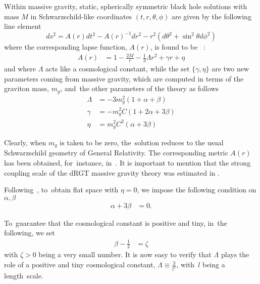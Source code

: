 \documentclass[aps,amsmath,amssymb,twocolumn]{revtex4}
\begin{document}
Within massive gravity, static, spherically symmetric black hole solutions with mass $M$ in Schwarzschild-like coordinates $(t,r,\theta,\phi)$ are given by the following line element
%
\begin{equation}
ds^2 = A(r) dt^2 - A(r)^{-1} dr^2 -  r^2 ( d \theta^2 + \sin^2\theta d \phi^2 )
\end{equation}
%
where the corresponding lapse function, $A(r)$, is found to be~\cite{Panpanich:2018cxo} :
%
\begin{align}
A(r) &=1 - \frac{2 M}{r} - \frac{1}{3} \Lambda  r^2
+ \gamma  r + \eta 
\end{align}
%
and where $\Lambda$ acts like a cosmological constant, while the set $\{ \gamma, \eta \}$ are two new parameters coming from massive gravity, which are computed in terms of the graviton 
mass, $m_g$, and~the other parameters of the theory as follows~\cite{Panpanich:2018cxo}
\begin{align}
\Lambda &=  -3m_g^2(1+\alpha+\beta)
\\
\gamma &= -m_g^2C(1+2\alpha+3\beta)  
\\
\eta &= m_g^2C^2(\alpha+3\beta)  
\end{align}
%
 
Clearly, when $m_g$ is taken to be zero, the~solution reduces to the usual Schwarzschild geometry of General Relativity. The corresponding metric $A(r)$ has been obtained, for~instance, in~\cite{Ghosh:2015cva,Boonserm:2019mon}. It is important to mention that the strong coupling scale of the dRGT massive gravity theory was estimated in \cite{Boonserm:2019mon}.


Following~\cite{Panpanich:2018cxo}, to~obtain flat space with $\eta=0$, we impose the following condition on $\alpha, \beta$
%
\begin{align}
     \alpha+3\beta &=0.
\end{align}
 
To~guarantee that the cosmological constant is positive and tiny, in~the following, we  set
%
\begin{align}
     \beta - \frac{1}{2} &= \zeta
\end{align}
%
with $\zeta > 0$ being a very small number. It is now easy to verify that $\Lambda$ plays the role of a positive and tiny cosmological constant,
$\Lambda \equiv \frac{3}{l^2}$, with~$l$ being a length~scale.
\end{document}
